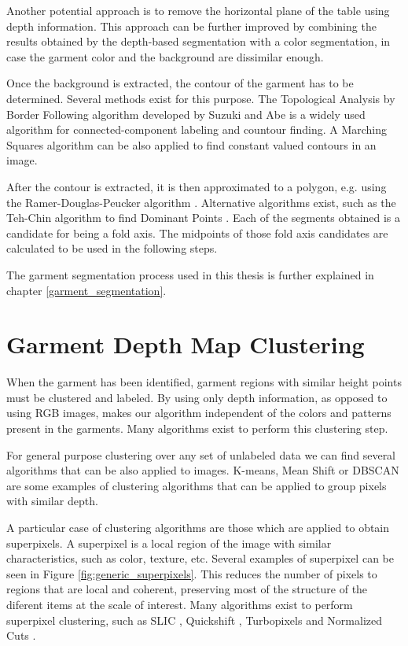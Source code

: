 Another potential approach is to remove the horizontal plane of the table using depth information. This approach can be further improved by combining the results obtained by the depth-based segmentation with a color segmentation, in case the garment color and the background are dissimilar enough.

Once the background is extracted, the contour of the garment has to be determined. Several methods exist for this purpose. The Topological Analysis by Border Following algorithm developed by Suzuki and Abe  {} is a widely used algorithm for connected-component labeling and countour finding. A Marching Squares  algorithm can be also applied to find constant valued contours in an image.

After the contour is extracted, it is then approximated to a polygon, e.g. using the Ramer-Douglas-Peucker algorithm . Alternative algorithms exist, such as the Teh-Chin algorithm to find Dominant Points  {}. Each of the segments obtained is a candidate for being a fold axis. The midpoints of those fold axis candidates are calculated to be used in the following steps.

The garment segmentation process used in this thesis is further explained in chapter \ref{garment_segmentation}.

\section{Garment Depth Map Clustering}
\label{architecture:depth_map_clustering}
When the garment has been identified, garment regions with similar height points must be clustered and labeled. By using only depth information, as opposed to using RGB images, makes our algorithm independent of the colors and patterns present in the garments. Many algorithms exist to perform this clustering step.

For general purpose clustering over any set of unlabeled data we can find several algorithms that can be also applied to images. K-means, Mean Shift  or DBSCAN  are some examples of clustering algorithms that can be applied to group pixels with similar depth.

A particular case of clustering algorithms are those which are applied to obtain superpixels. A superpixel  is a local region of the image with similar characteristics, such as color, texture, etc. Several examples of superpixel can be seen in Figure \ref{fig:generic_superpixels}. This reduces the number of pixels to regions that are local and coherent, preserving most of the structure of the diferent items at the scale of interest. Many algorithms exist to perform superpixel clustering, such as SLIC , Quickshift , Turbopixels  and Normalized Cuts .

